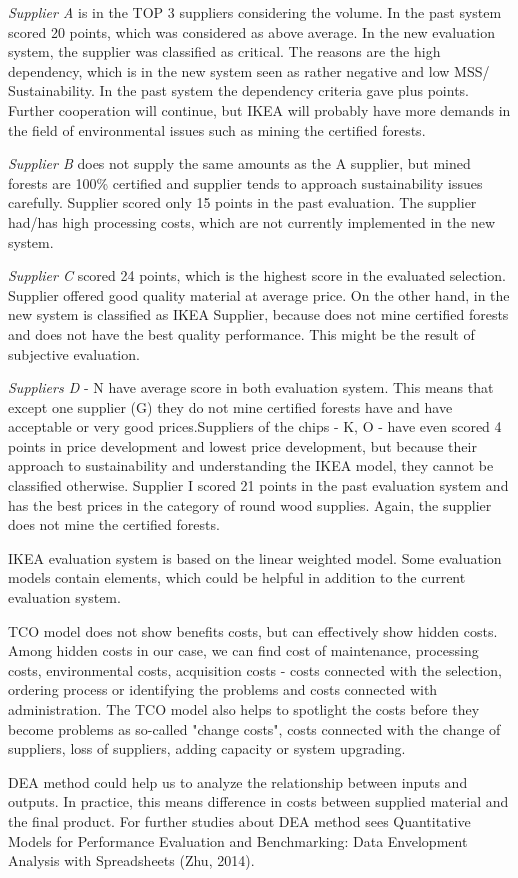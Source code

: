 \documentclass[oneside,12pt]{article}%
\begin{document}
\newline
\emph{Supplier A} is in the TOP 3 suppliers considering the volume. In the past system scored 20 points, which was considered as above average. In the new evaluation system, the supplier was classified as critical. The reasons are the high dependency, which is in the new system seen as rather negative and low MSS/ Sustainability. In the past system the dependency criteria  gave plus points. Further cooperation will continue, but IKEA will probably have more demands in the field of environmental issues such as mining the certified forests. \par
\emph{Supplier B} does not supply the same amounts as the A supplier, but mined forests are 100\% certified and supplier tends to approach sustainability issues carefully. Supplier scored only 15 points in the past evaluation. The supplier had/has high processing costs, which are not currently implemented in the new system. \par
\emph{Supplier C} scored 24 points, which is the highest score in the evaluated selection. Supplier offered good quality material at average price. On the other hand, in the new system is classified as IKEA Supplier, because does not mine certified forests and does not have the best quality performance. This might be the result of subjective evaluation.\par
\emph{Suppliers D} - N have average score in both evaluation system. This means that except one supplier (G) they do not mine certified forests have and have acceptable or very good prices.Suppliers of the chips - K, O -  have even scored 4 points in price development and lowest price development, but because their approach to sustainability and understanding the IKEA model, they cannot be classified otherwise. Supplier I scored 21 points in the past evaluation system and has the best prices in the category of round wood supplies. Again, the supplier does not mine the certified forests.



IKEA evaluation system is based on the linear weighted model. Some evaluation models contain elements, which could be helpful in addition to the current evaluation system. \par
TCO model does not show benefits costs, but can effectively show hidden costs. Among hidden costs in our case, we can find cost of maintenance, processing costs, environmental costs, acquisition costs - costs connected with the selection, ordering process or identifying the problems and costs connected with administration. The TCO model also helps to spotlight the costs before they become problems as so-called  "change costs", costs connected with the change of suppliers, loss of suppliers, adding capacity or system upgrading. \par
DEA method could help us to analyze the relationship between inputs and outputs. In practice, this means difference in costs between supplied material and the final product. For further studies about DEA method sees Quantitative Models for Performance Evaluation and Benchmarking: Data Envelopment Analysis with Spreadsheets (Zhu, 2014).
\end{document}
